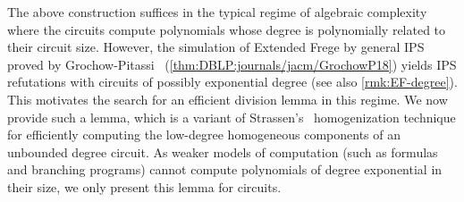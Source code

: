\documentclass{toc}
\begin{document}
The above construction suffices in the typical regime of algebraic complexity where the circuits compute polynomials whose degree is
%
polynomially related   %
to their circuit size.  However, the simulation of Extended Frege by general IPS proved by Grochow-Pitassi~\cite{DBLP:journals/jacm/GrochowP18} (\autoref{thm:DBLP:journals/jacm/GrochowP18}) yields IPS refutations with circuits of possibly exponential degree (see also \autoref{rmk:EF-degree}).
This motivates the search for an efficient division lemma in this regime.  We now provide such a lemma, which is a variant of Strassen's~\cite{Strassen73} homogenization technique for efficiently computing the low-degree homogeneous components of an unbounded degree circuit.  As weaker models of computation (such as formulas and branching programs) cannot compute polynomials of degree exponential in their size, we only present this lemma for circuits. %
\end{document}
